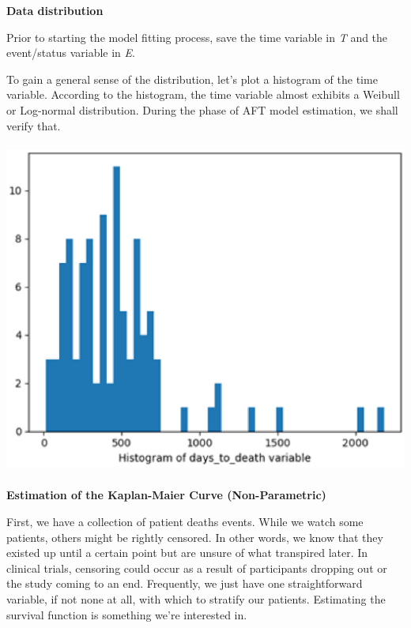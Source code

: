 \documentclass{article} %
\begin{document}


\noindent 

\noindent 

\noindent 

\noindent 

\noindent \textbf{Data distribution}

\noindent \textbf{}

\noindent Prior to starting the model fitting process, save the time variable in \textit{T} and the event/status variable in \textit{E}.

\noindent To gain a general sense of the distribution, let's plot a histogram of the time variable. According to the histogram, the time variable almost exhibits a Weibull or Log-normal distribution. During the phase of AFT model estimation, we shall verify that.

\noindent \textbf{}

\noindent \includegraphics*[width=6.57in, height=4.33in, keepaspectratio=false]{image1}\textbf{}

\noindent \textbf{}

\noindent \textbf{}

\noindent \textbf{}

\noindent \textbf{Estimation of the Kaplan-Maier Curve (Non-Parametric)}

\noindent \textbf{}

\noindent First, we have a collection of patient deaths events. While we watch some patients, others might be rightly censored. In other words, we know that they existed up until a certain point but are unsure of what transpired later. In clinical trials, censoring could occur as a result of participants dropping out or the study coming to an end. Frequently, we just have one straightforward variable, if not none at all, with which to stratify our patients. Estimating the survival function is something we're interested in.
\end{document}
